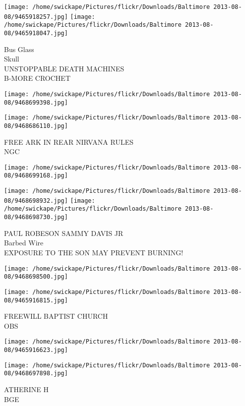 \documentclass[10pt,letterpaper]{article}
\begin{document}
\texttt{[image: /home/swickape/Pictures/flickr/Downloads/Baltimore 2013-08-08/9465918257.jpg]}
\texttt{[image: /home/swickape/Pictures/flickr/Downloads/Baltimore 2013-08-08/9465918047.jpg]}

Bus Glass\\
Skull\\
UNSTOPPABLE DEATH MACHINES\\
B{-}MORE CROCHET
\pagebreak

\texttt{[image: /home/swickape/Pictures/flickr/Downloads/Baltimore 2013-08-08/9468699398.jpg]}

\vspace{0.25in}
\texttt{[image: /home/swickape/Pictures/flickr/Downloads/Baltimore 2013-08-08/9468686110.jpg]}

FREE ARK IN REAR NIRVANA RULES\\
NGC
\pagebreak

\texttt{[image: /home/swickape/Pictures/flickr/Downloads/Baltimore 2013-08-08/9468699168.jpg]}

\vspace{0.25in}
\texttt{[image: /home/swickape/Pictures/flickr/Downloads/Baltimore 2013-08-08/9468698932.jpg]}
\texttt{[image: /home/swickape/Pictures/flickr/Downloads/Baltimore 2013-08-08/9468698730.jpg]}

PAUL ROBESON SAMMY DAVIS JR\\
Barbed Wire\\
EXPOSURE TO THE SON MAY PREVENT BURNING!
\pagebreak

\texttt{[image: /home/swickape/Pictures/flickr/Downloads/Baltimore 2013-08-08/9468698500.jpg]}

\vspace{0.25in}
\texttt{[image: /home/swickape/Pictures/flickr/Downloads/Baltimore 2013-08-08/9465916815.jpg]}

FREEWILL BAPTIST CHURCH\\
OBS
\pagebreak

\texttt{[image: /home/swickape/Pictures/flickr/Downloads/Baltimore 2013-08-08/9465916623.jpg]}

\vspace{0.25in}
\texttt{[image: /home/swickape/Pictures/flickr/Downloads/Baltimore 2013-08-08/9468697898.jpg]}

ATHERINE H\\
BGE
\pagebreak
\end{document}
